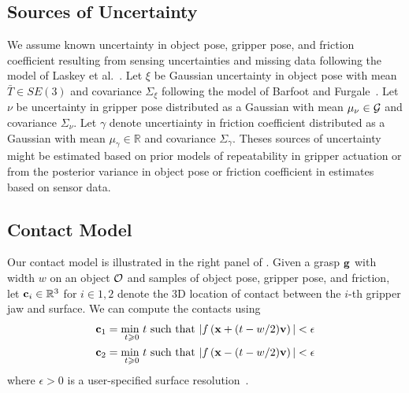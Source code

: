 \subsection{Sources of Uncertainty}
We assume known uncertainty in object pose, gripper pose, and friction coefficient resulting from sensing uncertainties and missing data following the model of Laskey et al.~\cite{laskey2015bandits}.
Let $\xi$ be Gaussian uncertainty in object pose with mean $\bar{T} \in SE(3)$ and covariance $\Sigma_{\xi}$ following the model of Barfoot and Furgale~\cite{barfoot2014associating}.
Let $\nu$ be uncertainty in gripper pose distributed as a Gaussian with mean $\mu_{\nu} \in \mathcal{G}$ and covariance $\Sigma_{\nu}$.
Let $\gamma$ denote uncertiainty in friction coefficient distributed as a Gaussian with mean $\mu_{\gamma} \in \mathbb{R}$ and covariance $\Sigma_{\gamma}$.
Theses sources of uncertainty might be estimated based on prior models of repeatability in gripper actuation or from the posterior variance in object pose or friction coefficient in estimates based on sensor data.

\subsection{Contact Model}
Our contact model is illustrated in the right panel of .
Given a grasp $\mathbf{g}$ with width $w$ on an object $\mathcal{O}$ and samples of object pose, gripper pose, and friction, let $\mathbf{c}_i \in \mathbb{R}^3$ for $i \in {1, 2}$ denote the 3D location of contact between the $i$-th gripper jaw and surface.
We can compute the contacts using
\begin{align*}
	\mathbf{c}_1 &= \underset{t \geqslant 0}{\text{min }} t \text{ such that } | f\left(\mathbf{x} + (t - w / 2) \mathbf{v}\right) | < \epsilon \\
	\mathbf{c}_2 &= \underset{t \geqslant 0}{\text{min }} t \text{ such that } | f\left(\mathbf{x} - (t - w / 2) \mathbf{v}\right) | < \epsilon
\end{align*}
\noindent where $\epsilon > 0$ is a user-specified surface resolution~\cite{mahler2015gp}.

